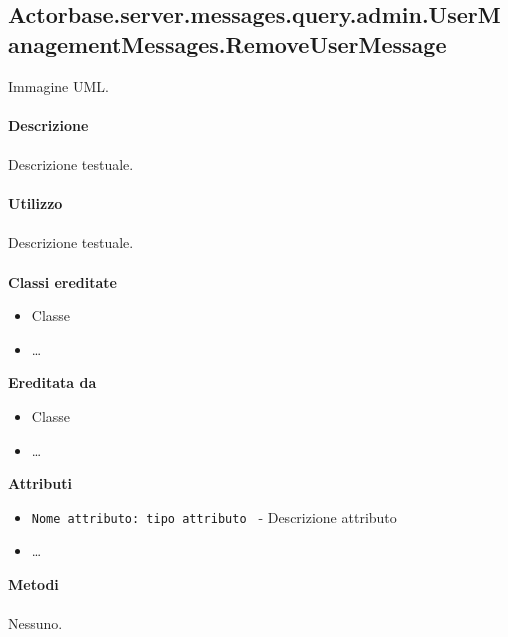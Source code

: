 \documentclass[a4paper]{article}
\begin{document}
	\subsection{Actorbase.server.messages.query.admin.UserManagementMessages.RemoveUserMessage}
		Immagine UML.
		\\ \\
		\textbf{Descrizione}
			\\ \\
			Descrizione testuale.
			\\ \\
		\textbf{Utilizzo}
			\\ \\
			Descrizione testuale.
			\\ \\
		\textbf{Classi ereditate}
			\begin{itemize}
				\item Classe
				\item \dots
			\end{itemize}
		\textbf{Ereditata da}
			\begin{itemize}
				\item Classe
				\item \dots
			\end{itemize}
		\textbf{Attributi}
			\begin{itemize}
				\item \texttt{Nome attributo: tipo attributo } - Descrizione attributo
				\item \dots
			\end{itemize}
		\textbf{Metodi}
			\\ \\
			Nessuno.	
			
\end{document}
